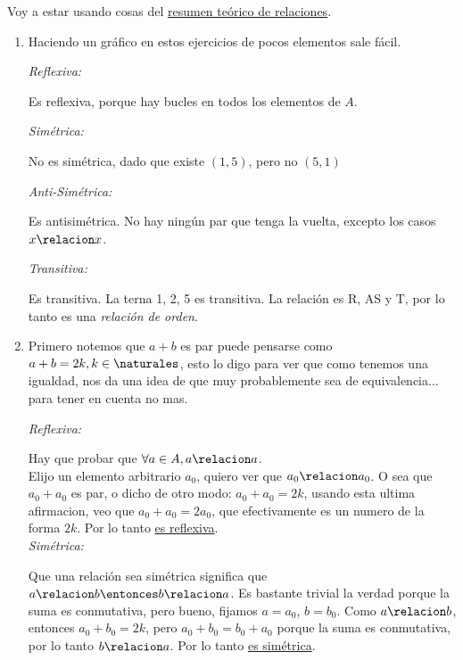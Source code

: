 Voy a estar usando cosas del \hyperlink{teoria-1:relaciones}{resumen teórico de relaciones}.

\begin{enumerate}[label=\roman*)]
  \item Haciendo un gráfico en estos ejercicios de pocos elementos sale fácil.

        \begin{minipage}{0.60\textwidth}
          \textit{Reflexiva:}

          Es reflexiva, porque hay bucles en todos los elementos de $A$.

          \textit{Simétrica:}

          No es simétrica, dado que existe $(1, 5)$, pero no $(5, 1)$

          \textit{Anti-Simétrica:}

          Es antisimétrica. No hay ningún par que tenga la vuelta, excepto los casos $x \relacion x$.

          \textit{Transitiva:}

          Es transitiva. La terna 1, 2, 5 es transitiva.
          La relación es R, AS y T, por lo tanto es una \textit{relación de orden}.
        \end{minipage}
        \begin{minipage}{0.3\textwidth}
          \quad  \veintidosi
        \end{minipage}

  \item Primero notemos que $a + b$ es par puede pensarse como $a + b = 2k, k \in \naturales$, esto lo digo
        para ver que como tenemos una igualdad, nos da una idea de que muy probablemente sea de equivalencia... para tener en cuenta no mas.

        \textit{Reflexiva:}

        Hay que probar que $\forall a \in A, a \relacion a$. \\
        Elijo un elemento arbitrario $a_0$, quiero ver que $a_0 \relacion a_0$. O sea que $a_0 + a_0$ es par, o
        dicho de otro modo: $a_0 + a_0 = 2k$, usando esta ultima afirmacion, veo que $a_0 + a_0 = 2a_0$, que efectivamente
        es un numero de la forma $2k$. Por lo tanto \underline{es reflexiva}. \\

        \textit{Simétrica: }

        Que una relación sea simétrica significa que $a \relacion b \entonces b \relacion a$.
        Es bastante trivial la verdad porque la suma es conmutativa, pero bueno, fijamos $a = a_0$, $b = b_0$.
        Como $a \relacion b$, entonces $a_0 + b_0 = 2k$, pero $a_0 + b_0 = b_0 + a_0$ porque la suma es conmutativa,
        por lo tanto $b \relacion a$. Por lo tanto \underline{es simétrica}. \\


\end{enumerate}
